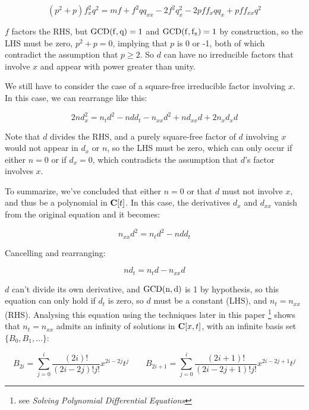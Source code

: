 \documentclass{article}
\newcommand{\C}{\ensuremath{{\bf C}}}
\newcommand{\GCD}{\ensuremath{\rm{GCD}}}
\begin{document}
$$(p^{2} +p)f_x^{2}q^{2} = m f+f^{2}qq_{xx} -2f^{2}q_x^{2} -2pff_xqq_x +pff_{xx}q^{2}$$

$f$ factors the RHS, but $\GCD(f,q)=1$ and $\GCD(f,f_x)=1$ by
construction, so the LHS must be zero, $p^2 + p = 0$, implying that
$p$ is 0 or -1, both of which contradict the assumption that $p \ge
2$.  So $d$ can have no irreducible factors that involve $x$ and
appear with power greater than unity.

\begin{comment}
The leading term in $2nd_x^2 - n d_{xx} d$ is of power $x^{2r-2}$ and
has coefficient $2r^2 d_r - r(r-1)d_r^2$, so $r^2 + r =0$, and $r$
must be either $0$ or $-1$.  Obviously it can't be $-1$, what about
$0$?  Then $d$ would be a polynomial in $t$ that didn't involve $x$.
\end{comment}

We still have to consider the case of a square-free irreducible factor
involving $x$.  In this case, we can rearrange like this:

$$2nd_x^2 = n_t d^2 - n d d_t - n_{xx} d^2 + n d_{xx} d + 2 n_{x}d_{x}d$$

Note that $d$ divides the RHS, and a purely square-free factor of $d$
involving $x$ would not appear in $d_x$ or $n$, so the LHS must be
zero, which can only occur if either $n=0$ or if $d_x=0$, which
contradicts the assumption that $d$'s factor involves $x$.

To summarize, we've concluded that either $n=0$ or that $d$ must not
involve $x$, and thus be a polynomial in $\C[t]$.  In this case, the
derivatives $d_x$ and $d_{xx}$ vanish from the original equation and it becomes:

$$n_{xx} d^2 = n_t d^2 - n d d_t$$

Cancelling and rearranging:

$$n d_t = n_t d - n_{xx} d$$

$d$ can't divide its own derivative, and $\GCD(n,d)$ is 1 by
hypothesis, so this equation can only hold if $d_t$ is zero, so $d$
must be a constant (LHS), and $n_t = n_{xx}$ (RHS).  Analysing
this equation using the techniques later in this paper
\footnote{see {\it Solving Polynomial Differential Equations}}
shows that $n_t = n_{xx}$ admits an infinity of solutions
in $\C[x,t]$, with an infinite basis set $\{B_0, B_1, \ldots\}$:

$$B_{2i} = \sum_{j=0}^i \frac{(2i)!}{(2i-2j)!j!} x^{2i-2j} t^{j}
\qquad B_{2i+1} = \sum_{j=0}^i \frac{(2i+1)!}{(2i-2j+1)!j!} x^{2i-2j+1} t^{j}$$
\end{document}
